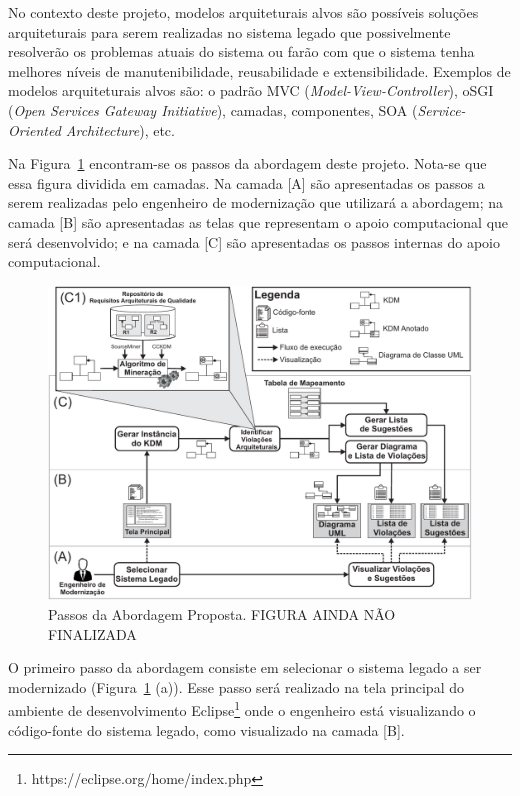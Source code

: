 \documentclass[12pt]{article}
\begin{document}
No contexto deste projeto, modelos arquiteturais alvos são possíveis soluções arquiteturais para serem realizadas no sistema legado que possivelmente resolverão os problemas atuais do sistema ou farão com que o sistema tenha melhores níveis de manutenibilidade, reusabilidade e extensibilidade. Exemplos de modelos arquiteturais alvos são: o padrão MVC (\textit{Model-View-Controller}), oSGI (\textit{Open Services Gateway Initiative}), camadas, componentes, SOA (\textit{Service-Oriented Architecture}), etc.

Na Figura~\ref{fig:approach_steps} encontram-se os passos da abordagem deste projeto. Nota-se que essa figura dividida em camadas. Na camada [A] são apresentadas os passos a serem realizadas pelo engenheiro de modernização que utilizará a abordagem; na camada [B] são apresentadas as telas que representam o apoio computacional que será desenvolvido; e na camada [C] são apresentadas os passos internas do apoio computacional.

\begin{figure}[htb]
 \caption{Passos da Abordagem Proposta. FIGURA AINDA NÃO FINALIZADA}
 \label{fig:approach_steps}
 \centering
 \includegraphics[scale=0.77]{abordagemSteps.pdf}
\end{figure}

O primeiro passo da abordagem consiste em selecionar o sistema legado a ser modernizado (Figura~\ref{fig:approach_steps} (a)). Esse passo será realizado na tela principal do ambiente de desenvolvimento Eclipse\footnote{https://eclipse.org/home/index.php} onde o engenheiro está visualizando o código-fonte do sistema legado, como visualizado na camada [B]. 
\end{document}
